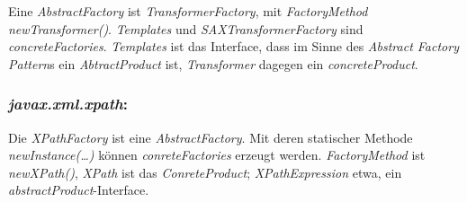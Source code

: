 \documentclass[a4paper]{article}
\begin{document}
	Eine \textit{AbstractFactory} ist \textit{TransformerFactory}, mit \textit{FactoryMethod newTransformer()}. 
	\textit{Templates} und \textit{SAXTransformerFactory} sind \textit{concreteFactories}. \textit{Templates} ist das Interface, 
	dass im Sinne des \emph{Abstract Factory Pattern}s ein \textit{AbtractProduct} ist, \textit{Transformer} dagegen ein
	\textit{concreteProduct}.
	
	\subsubsection*{\textit{javax.xml.xpath}:}
	
	Die \textit{XPathFactory} ist eine \textit{AbstractFactory}. Mit deren statischer Methode \textit{newInstance(\dots)} können \textit{conreteFactories} erzeugt werden.
	\textit{FactoryMethod} ist \textit{newXPath()}, \textit{XPath} ist das \textit{ConreteProduct}; \textit{XPathExpression} etwa, ein \textit{abstractProduct}-Interface.
	
	
\end{document}
